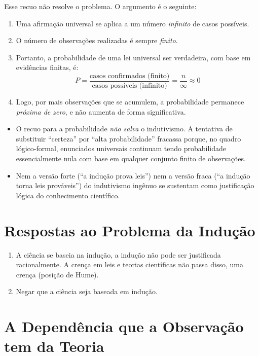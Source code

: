 \documentclass[9pt,a4paper]{extarticle}
\begin{document}
Esse recuo não resolve o problema. O argumento é o seguinte:

\begin{enumerate}
    \item Uma afirmação universal se aplica a um número \textit{infinito} de casos possíveis.
    \item O número de observações realizadas é sempre \textit{finito}.
    \item Portanto, a probabilidade de uma lei universal ser verdadeira, com base em evidências finitas, é:
    \[
        P = \frac{\text{casos confirmados (finito)}}{\text{casos possíveis (infinito)}} = \frac{n}{\infty} \approx 0
    \]
    \item Logo, por mais observações que se acumulem, a probabilidade permanece \textit{próxima de zero}, e não aumenta de forma significativa.
\end{enumerate}


\begin{itemize}
    \item O recuo para a probabilidade \textit{não salva} o indutivismo. A tentativa de substituir ``certeza'' por ``alta probabilidade'' fracassa porque, no quadro lógico-formal, enunciados universais continuam tendo probabilidade essencialmente nula com base em qualquer conjunto finito de observações.
    
    \item Nem a versão forte (``a indução prova leis'') nem a versão fraca (``a indução torna leis prováveis'') do indutivismo ingênuo se sustentam como justificação lógica do conhecimento científico.

\end{itemize}

\section{Respostas ao Problema da Indução}

\begin{enumerate}
    \item A ciência se baseia na indução, a indução não pode ser justificada racionalmente. A crença em leis e teorias científicas não passa disso, uma crença (posição de Hume).
    \item Negar que a ciência seja baseada em indução. 
\end{enumerate}

\section{A Dependência que a Observação tem da Teoria}
\end{document}
